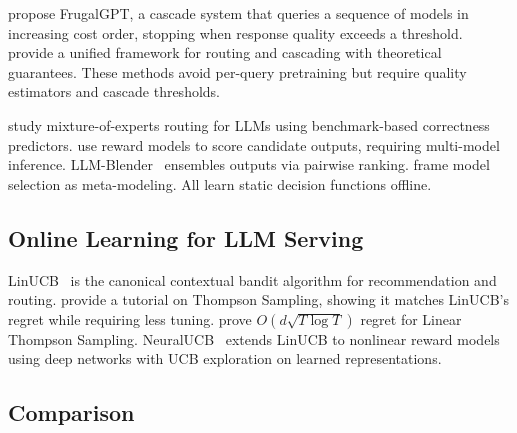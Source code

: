 \documentclass[11pt]{article}
\begin{document}
\cite{chen2023frugalgpt} propose FrugalGPT, a cascade system that queries a sequence of models in increasing cost order, stopping when response quality exceeds a threshold. \cite{dekoninck2025unified} provide a unified framework for routing and cascading with theoretical guarantees. These methods avoid per-query pretraining but require quality estimators and cascade thresholds.

\cite{shnitzer2023large} study mixture-of-experts routing for LLMs using benchmark-based correctness predictors. \cite{lu2023routing} use reward models to score candidate outputs, requiring multi-model inference. LLM-Blender~\cite{jiang2023llmblender} ensembles outputs via pairwise ranking. \cite{vsakota2024flyswat} frame model selection as meta-modeling. All learn static decision functions offline.

\subsection{Online Learning for LLM Serving}

LinUCB~\cite{li2010contextual} is the canonical contextual bandit algorithm for recommendation and routing. \cite{russo2018tutorial} provide a tutorial on Thompson Sampling, showing it matches LinUCB's regret while requiring less tuning. \cite{abeille2017linear} prove $O(d\sqrt{T\log T})$ regret for Linear Thompson Sampling. NeuralUCB~\cite{zhou2020neural} extends LinUCB to nonlinear reward models using deep networks with UCB exploration on learned representations.

\subsection{Comparison}
\end{document}
